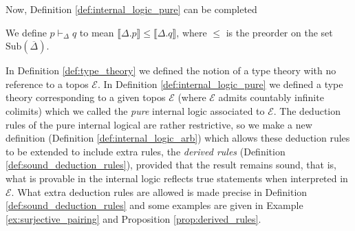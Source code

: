 \documentclass{tac}
\newcommand{\call}[1]{\mathcal{#1}}
\begin{document}
	Now, Definition \ref{def:internal_logic_pure} can be completed
	\begin{definition}
		We define $p \vdash_{\Delta} q$ to mean $\llbracket \Delta . p \rrbracket \leq \llbracket \Delta . q \rrbracket$, where $\leq$ is the preorder on the set $\text{Sub}(\overline{\Delta})$.
	\end{definition}
	In Definition \ref{def:type_theory} we defined the notion of a type theory with no reference to a topos $\call{E}$. In Definition \ref{def:internal_logic_pure} we defined a type theory corresponding to a given topos $\call{E}$ (where $\call{E}$ admits countably infinite colimits) which we called the \emph{pure} internal logic associated to $\call{E}$. The deduction rules of the pure internal logical are rather restrictive, so we make a new definition (Definition \ref{def:internal_logic_arb}) which allows these deduction rules to be extended to include extra rules, the \emph{derived rules} (Definition \ref{def:sound_deduction_rules}), provided that the result remains sound, that is, what is provable in the internal logic reflects true statements when interpreted in $\call{E}$. What extra deduction rules are allowed is made precise in Definition \ref{def:sound_deduction_rules} and some examples are given in Example \ref{ex:surjective_pairing} and Proposition \ref{prop:derived_rules}.
\end{document}
